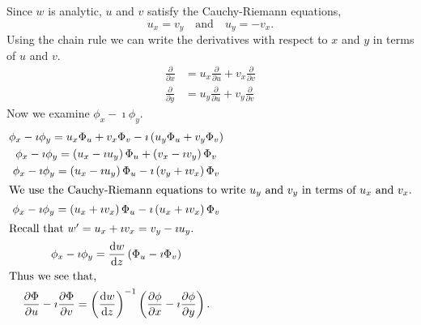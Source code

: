 {%
\begin{Solution}
  \label{solution w=u+iv is analytic}
  Since $w$ is analytic, $u$ and $v$ satisfy the Cauchy-Riemann equations,
  \[
  u_x = v_y \quad \mathrm{and} \quad u_y = - v_x.
  \]
  Using the chain rule we can write the derivatives with respect to 
  $x$ and $y$ in terms of $u$ and $v$.
  \begin{align*}
    \frac{\partial}{\partial x} &= u_x  \frac{\partial}{\partial u} + v_x  \frac{\partial}{\partial v} 
    \\
    \frac{\partial}{\partial y} &= u_y  \frac{\partial}{\partial u} + v_y  \frac{\partial}{\partial v}
  \end{align*}
  Now we examine $\phi_x - \imath \phi_y$.
  \begin{gather*}
    \phi_x - \imath \phi_y = u_x \Phi_u + v_x \Phi_v - \imath  \left( u_y \Phi_u + v_y \Phi_v \right) 
    \\
    \phi_x - \imath \phi_y = \left( u_x - \imath u_y \right) \Phi_u + \left( v_x - \imath v_y \right) \Phi_v 
    \\
    \phi_x - \imath \phi_y = \left( u_x - \imath u_y \right) \Phi_u 
    - \imath  \left( v_y + \imath v_x \right) \Phi_v 
    \\
    \intertext{We use the Cauchy-Riemann equations to write $u_y$ and $v_y$
      in terms of $u_x$ and $v_x$.}
    \phi_x - \imath \phi_y = \left( u_x + \imath v_x \right) \Phi_u 
    - \imath  \left( u_x + \imath v_x \right) \Phi_v 
    \\
    \intertext{Recall that $w' = u_x + \imath v_x = v_y - \imath u_y$.}
    \phi_x - \imath \phi_y = \frac{\mathrm{d} w}{\mathrm{d} z} \left( \Phi_u - \imath \Phi_v \right) 
    \\
    \intertext{Thus we see that,}
    \frac{\partial \Phi}{\partial u} - \imath  \frac{\partial \Phi}{\partial v} = 
    \left( \frac{\mathrm{d} w}{\mathrm{d} z} \right)^{-1} 
    \left( \frac{\partial \phi}{\partial x} - \imath  \frac{\partial \phi}{\partial y} \right).
  \end{gather*}



\end{Solution}}
